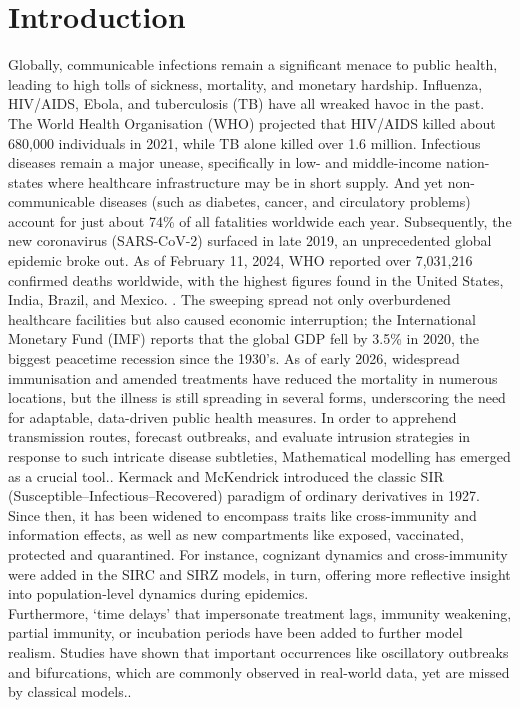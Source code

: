 \documentclass[10pt]{NSP1}
\begin{document}
\section{Introduction}

Globally, communicable infections remain a significant menace to public health, leading to high tolls of sickness, mortality, and monetary hardship. Influenza, HIV/AIDS, Ebola, and tuberculosis (TB) have all wreaked havoc in the past.\cite{ref1,ref2,ref3,ref4} The World Health Organisation (WHO) projected that HIV/AIDS killed about 680,000 individuals in 2021, while TB alone killed over 1.6 million. \cite{ref5,ref6} Infectious diseases remain a major unease, specifically in low- and middle-income nation-states where healthcare infrastructure may be in short supply. And yet non-communicable diseases (such as diabetes, cancer, and circulatory problems) account for just about 74\% of all fatalities worldwide each year.\cite{ref7} Subsequently, the new coronavirus (SARS-CoV-2) surfaced in late 2019, an unprecedented global epidemic broke out. As of February 11, 2024, WHO reported over 7,031,216 confirmed deaths worldwide, with the highest figures found in the United States, India, Brazil, and Mexico. \cite{ref8}. The sweeping spread not only overburdened healthcare facilities but also caused economic interruption; the International Monetary Fund (IMF) reports that the global GDP fell by 3.5\% in 2020, the biggest peacetime recession since the 1930's.\cite{ref9} As of early 2026, widespread immunisation and amended treatments have reduced the mortality in numerous locations, but the illness is still spreading in several forms, underscoring the need for adaptable, data-driven public health measures.\cite{ref10} In order to apprehend transmission routes, forecast outbreaks, and evaluate intrusion strategies in response to such intricate disease subtleties, Mathematical modelling has emerged as a crucial tool.\cite{ref11,ref12,ref13}. Kermack and McKendrick introduced the classic SIR (Susceptible--Infectious--Recovered) paradigm of ordinary derivatives in 1927.\cite{ref14} Since then, it has been widened to encompass traits like cross-immunity and information effects, as well as new compartments like exposed, vaccinated, protected and quarantined. For instance, cognizant dynamics and cross-immunity were added in the SIRC and SIRZ models, in turn, offering more reflective insight into population-level dynamics during epidemics.\cite{ref15,ref16}\\
Furthermore, `time delays' that impersonate treatment lags, immunity weakening, partial immunity, or incubation periods have been added to further model realism. Studies have shown that important occurrences like oscillatory outbreaks and bifurcations, which are commonly observed in real-world data, yet are missed by classical models.\cite{ref17,ref18}.
\end{document}
